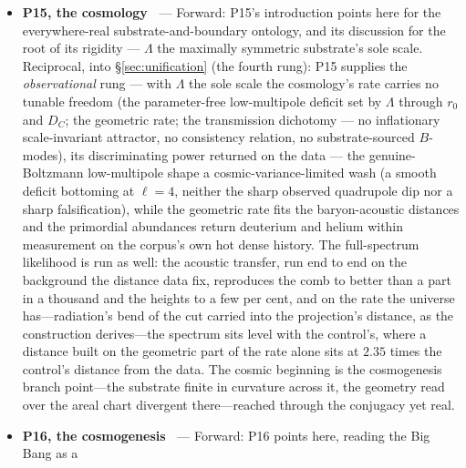 \documentclass[11pt,a4paper]{article}
\theoremstyle{definition}
\begin{document}
\begin{itemize}
the boundary's single geometric opening realised, three chiral seats
related by a global $S_3$ with $R=\gamma^5$ chirality, forced within CR as the
maximally-symmetric slicing of a maximally-symmetric substrate, the gauge and
mass content external, and the generations seated on the comoving turnaround's cyclic three. The count
is the substrate's discrete symmetry worn as matter. Its counts carry the shape of the left--right-symmetric
generation, whose exchange is the substrate's spatial parity---a symmetry of the law broken only by a member's
mass---so couplings that carry it hold the vacuum angle at a $CP$-conserving value at tree level, the couplings
themselves the ordinary route.
\item \textbf{P15, the cosmology~\cite{JanzenCRcosmology}} --- Forward: P15's introduction points here for the everywhere-real
substrate-and-boundary ontology, and its discussion for the root of its rigidity ---
$\Lambda$ the maximally symmetric substrate's sole scale. Reciprocal, into
\S\ref{sec:unification} (the fourth rung): P15 supplies the \emph{observational}
rung --- with $\Lambda$ the sole scale the cosmology's rate carries no tunable
freedom (the parameter-free low-multipole deficit set by $\Lambda$ through
$r_0$ and $D_C$; the geometric rate; the transmission dichotomy --- no
inflationary scale-invariant attractor, no consistency relation, no
substrate-sourced $B$-modes), its discriminating power
returned on the data --- the genuine-Boltzmann low-multipole shape a
cosmic-variance-limited wash (a smooth deficit bottoming at $\ell=4$,
neither the sharp observed quadrupole dip nor a sharp
falsification), while the geometric rate fits the baryon-acoustic distances and the primordial abundances return deuterium and helium within measurement on the corpus's own hot dense history. The full-spectrum
likelihood is run as well: the acoustic transfer, run end to end on the background the distance data fix,
reproduces the comb to better than a part in a thousand and the heights to a few per cent, and on the rate the universe
has---radiation's bend of the cut carried into the projection's distance, as the construction derives---the
spectrum sits level with the control's, where a distance built on the geometric part of the rate alone sits at
$2.35$ times the control's distance from the data. The cosmic beginning is the
cosmogenesis branch point---the substrate finite in curvature across it, the geometry read over
the areal chart divergent there---reached through the conjugacy yet real.
\item \textbf{P16, the cosmogenesis~\cite{JanzenCosmogenesis}} --- Forward: P16 points here, reading the Big Bang as a

\end{itemize}
\end{document}
